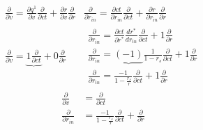 \begin{equation}
    \begin{array}{l|l}
        \frac{\partial}{\partial v}=\frac{\partial q^1}{\partial v} \frac{\partial}{\partial c t}+\frac{\partial r}{\partial v} \frac{\partial}{\partial r} & \frac{\partial}{\partial r_{i n}}=\frac{\partial c t}{\partial r_{i n}} \frac{\partial}{\partial c t}+\frac{\partial r}{\partial r_{i n}} \frac{\partial}{\partial r}                                 \\
        \frac{\partial}{\partial v}=\underbrace{1 \frac{\partial}{\partial c t}}+0 \frac{\partial}{\partial r}                                              & \begin{array}{l}
                                                                                                                                                                  \frac{\partial}{\partial r_{i n}}=\frac{\partial c t}{\partial r^*} \frac{d r^*}{d r_{i n}} \frac{\partial}{\partial c t}+1 \frac{\partial}{\partial r} \\
                                                                                                                                                                  \frac{\partial}{\partial r_{i n}}=\underbrace{(-1)} \frac{1}{1-r_s} \frac{\partial}{\partial c t}+1 \frac{\partial}{\partial r}                         \\
                                                                                                                                                                  \frac{\partial}{\partial r_{i n}}=\frac{-1}{1-\frac{r_s}{r}} \frac{\partial}{\partial c t}+1 \frac{\partial}{\partial r}
                                                                                                                                                              \end{array}
    \end{array}
\end{equation}
\begin{equation}
    \begin{aligned}
        \frac{\partial}{\partial v}       & =\frac{\partial}{\partial c t}                                                        \\
        \frac{\partial}{\partial r_{i n}} & =\frac{-1}{1-\frac{r_s}{r}} \frac{\partial}{\partial c t}+\frac{\partial}{\partial r}
    \end{aligned}
\end{equation}

